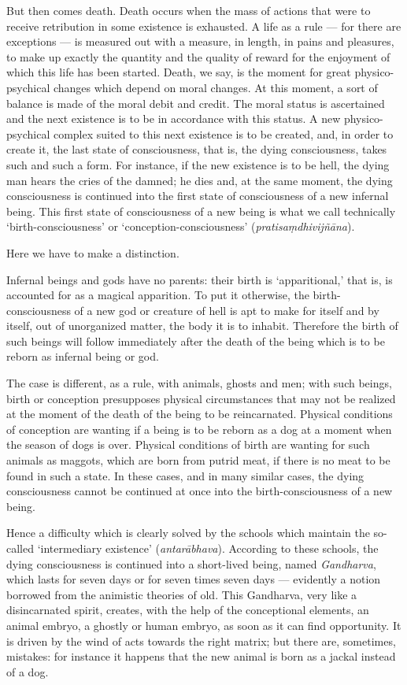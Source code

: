 \documentclass[a4paper, 11pt, oneside, english, landscape]{article}
\begin{document}
But then comes death. Death occurs when the mass of actions that were to receive retribution in some existence is exhausted. A life as a rule --- for there are exceptions --- is measured out with a measure, in length, in pains and pleasures, to make up exactly the quantity and the quality of reward for the enjoyment of which this life has been started. Death, we say, is the moment for great physico-psychical changes which depend on moral changes. At this moment, a sort of balance is made of the moral debit and credit. The moral status is ascertained and the next existence is to be in accordance with this status. A new physico-psychical complex suited to this next existence is to be created, and, in order to create it, the last state of consciousness, that is, the dying consciousness, takes such and such a form. For instance, if the new existence is to be hell, the dying man hears the cries of the damned; he dies and, at the same moment, the dying consciousness is continued into the first state of consciousness of a new infernal being. This first state of consciousness of a new being is what we call technically `birth-consciousness' or `conception-consciousness' (\emph{pratisaṃdhivijñāna}).

Here we have to make a distinction.

Infernal beings and gods have no parents: their birth is `apparitional,' that is, is accounted for as a magical apparition. To put it otherwise, the birth-consciousness of a new god or creature of hell is apt to make for itself and by itself, out of unorganized matter, the body it is to inhabit. Therefore the birth of such beings will follow immediately after the death of the being which is to be reborn as infernal being or god.

The case is different, as a rule, with animals, ghosts and men; with such beings, birth or conception presupposes physical circumstances that may not be realized at the moment of the death of the being to be reincarnated. Physical conditions of conception are wanting if a being is to be reborn as a dog at a moment when the season of dogs is over. Physical conditions of birth are wanting for such animals as maggots, which are born from putrid meat, if there is no meat to be found in such a state. In these cases, and in many similar cases, the dying consciousness cannot be continued at once into the birth-consciousness of a new being.

Hence a difficulty which is clearly solved by the schools which maintain the so-called `intermediary existence' (\emph{antarābhava}). According to these schools, the dying consciousness is continued into a short-lived being, named \emph{Gandharva}, which lasts for seven days or for seven times seven days --- evidently a notion borrowed from the animistic theories of old. This Gandharva, very like a disincarnated spirit, creates, with the help of the conceptional elements, an animal embryo, a ghostly or human embryo, as soon as it can find opportunity. It is driven by the wind of acts towards the right matrix; but there are, sometimes, mistakes: for instance it happens that the new animal is born as a jackal instead of a dog.
\end{document}
